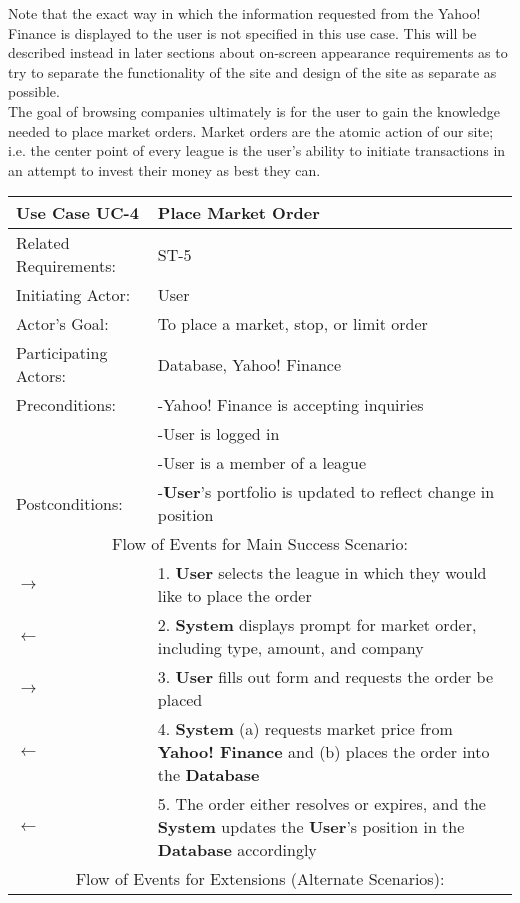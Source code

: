 Note that the exact way in which the information requested from the Yahoo! Finance is displayed to the user is not specified in this use case. This will be described instead in later sections about on-screen appearance requirements as to try to separate the functionality of the site and design of the site as separate as possible. \\

The goal of browsing companies ultimately is for the user to gain the knowledge needed to place market orders. Market orders are the atomic action of our site; i.e. the center point of every league is the user's ability to initiate transactions in an attempt to invest their money as best they can. \\

\begin{centering}
\label{UC-4}
\renewcommand\arraystretch{1.3} %
\begin{longtable}{|p{1.2in} p{5in}|}
\hline

\bfseries{\color{color1}Use Case UC-4} & \bfseries{\color{color1}Place Market Order} \\
\hline
Related Requirements: & ST-5 \\ 
Initiating Actor:     & User \\
Actor's Goal:         & To place a market, stop, or limit order \\
Participating Actors:  & Database, Yahoo! Finance \\
Preconditions:        & -Yahoo! Finance is accepting inquiries \\
 & -User is logged in \\
 & -User is a member of a league \\
Postconditions:       & -\textbf{User}'s portfolio is updated to reflect change in position \\
\hline
\multicolumn{2}{|c|}{\color{color1}Flow of Events for Main Success Scenario:}\\
\hline
$\rightarrow$ & 1. \textbf{User} selects the league in which they would like to place the order \\
$\leftarrow$ & 2. \textbf{System} displays prompt for market order, including type, amount, and company \\
$\rightarrow$ & 3. \textbf{User} fills out form and requests the order be placed \\
$\leftarrow$ & 4. \textbf{System} (a) requests market price from \textbf{Yahoo! Finance} and (b) places the order into the \textbf{Database} \\
$\leftarrow$ & 5. The order either resolves or expires, and the \textbf{System} updates the \textbf{User}'s position in the \textbf{Database} accordingly \\
\hline
\multicolumn{2}{|c|}{\color{color1}Flow of Events for Extensions (Alternate Scenarios):} \\
\hline


\end{longtable}
\end{centering}
